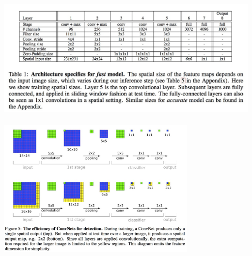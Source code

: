 \documentclass[xetex,mathserif,serif,aspectratio=169]{beamer}
\begin{document}
\begin{frame}[fragile] \frametitle{} \oldB \small

\begin{center}
\includegraphics[width=\textwidth]{img/overFeatModel.jpg}
\end{center}

\end{frame}

\begin{frame}[fragile] \frametitle{} \oldB \small

\begin{center}
\includegraphics[width=0.75\textwidth]{img/overFeatIdea.jpg}
\end{center}

\end{frame}
\end{document}
